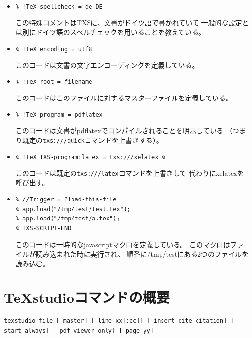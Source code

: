 \begin{itemize}
\item
  \lstinline"% !TeX spellcheck = de_DE"

  この特殊コメントはTXSに、文書がドイツ語で書かれていて
  一般的な設定とは別にドイツ語のスペルチェックを用いることを教えている。
\item
  \lstinline"% !TeX encoding = utf8"

  このコードは文書の文字エンコーディングを定義している。
\item
  \lstinline"% !TeX root = filename"

  このコードはこのファイルに対するマスターファイルを定義している。
\item
  \lstinline"% !TeX program = pdflatex"

  このコードは文書がpdflatexでコンパイルされることを明示している
  （つまり既定の\verb+txs:///quick+コマンドを上書きする）。
\item
  \lstinline"% !TeX TXS-program:latex = txs:///xelatex %"

  このコードは既定の\verb+txs:///latex+コマンドを上書きして
  代わりにxelatexを呼び出す。
\item
\begin{lstlisting}[frame=single]
% !TeX TXS-SCRIPT = foobar
% //Trigger = ?load-this-file
% app.load("/tmp/test/test.tex");
% app.load("/tmp/test/a.tex");
% TXS-SCRIPT-END
\end{lstlisting}

  このコードは一時的なjavascriptマクロを定義している。
  このマクロはファイルが読み込まれた時に実行され、
  順番に/tmp/testにある2つのファイルを読み込む。
\end{itemize}

\section{TeXstudioコマンドの概要}

\texttt{texstudio file {[}--master{]} {[}--line xx{[}:cc{]}{]} {[}--insert-cite citation{]} {[}--start-always{]} {[}--pdf-viewer-only{]} {[}--page yy{]}}

